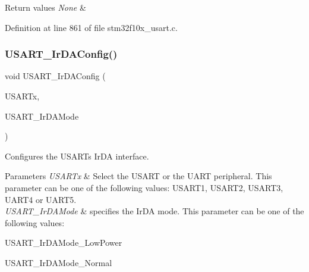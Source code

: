 \begin{DoxyRetVals}{Return values}
{\em None} & \\
\hline
\end{DoxyRetVals}


Definition at line 861 of file stm32f10x\+\_\+usart.\+c.

\mbox{\label{group___u_s_a_r_t___private___functions_ga81a0cd36199040bf6d266b57babd678e}} 
\subsubsection{\texorpdfstring{U\+S\+A\+R\+T\+\_\+\+Ir\+D\+A\+Config()}{USART\_IrDAConfig()}}
{\footnotesize\ttfamily void U\+S\+A\+R\+T\+\_\+\+Ir\+D\+A\+Config (\begin{DoxyParamCaption}\item[{\hyperlink{struct_u_s_a_r_t___type_def}{U\+S\+A\+R\+T\+\_\+\+Type\+Def} $\ast$}]{U\+S\+A\+R\+Tx,  }\item[{uint16\+\_\+t}]{U\+S\+A\+R\+T\+\_\+\+Ir\+D\+A\+Mode }\end{DoxyParamCaption})}



Configures the U\+S\+A\+RT\textquotesingle{}s Ir\+DA interface. 


\begin{DoxyParams}{Parameters}
{\em U\+S\+A\+R\+Tx} & Select the U\+S\+A\+RT or the U\+A\+RT peripheral. This parameter can be one of the following values\+: U\+S\+A\+R\+T1, U\+S\+A\+R\+T2, U\+S\+A\+R\+T3, U\+A\+R\+T4 or U\+A\+R\+T5. \\
\hline
{\em U\+S\+A\+R\+T\+\_\+\+Ir\+D\+A\+Mode} & specifies the Ir\+DA mode. This parameter can be one of the following values\+: \begin{DoxyItemize}
\item U\+S\+A\+R\+T\+\_\+\+Ir\+D\+A\+Mode\+\_\+\+Low\+Power \item U\+S\+A\+R\+T\+\_\+\+Ir\+D\+A\+Mode\+\_\+\+Normal \end{DoxyItemize}
\\
\hline
\end{DoxyParams}

